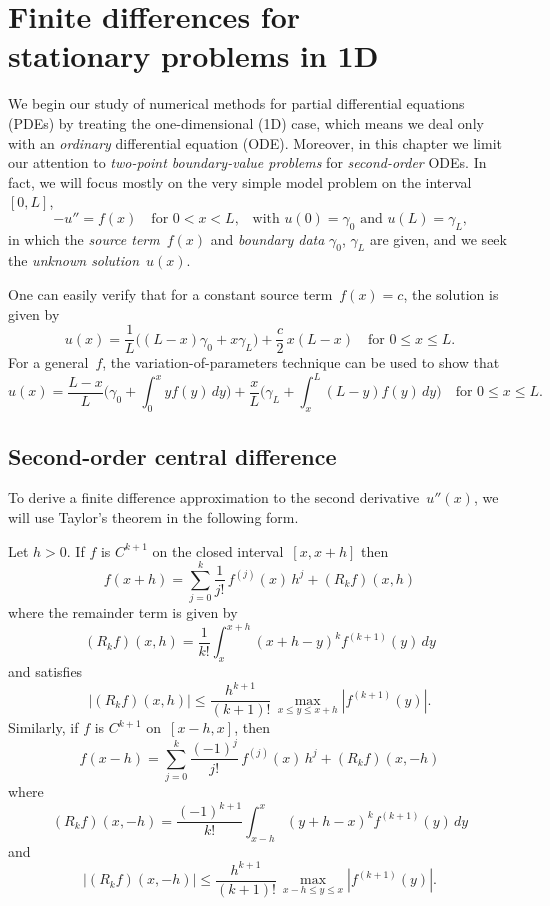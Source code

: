 \chapter[Finite differences in 1D]{Finite differences for \\ 
stationary problems in 1D}
\label{chap: finite diff 1d}
We begin our study of numerical methods for partial differential equations 
(PDEs) by treating the one-dimensional (1D) case, which means we deal only with 
an \emph{ordinary} differential equation (ODE).  Moreover, in this chapter we 
limit our attention to \emph{two-point boundary-value problems} for 
\emph{second-order} ODEs.  In fact, we will focus mostly on the very simple 
model problem on the interval~$[0,L]$,
\begin{equation}\label{eq: model 1d}
-u''=f(x)\quad\text{for $0<x<L$,}
	\quad\text{with $u(0)=\gamma_0$ and $u(L)=\gamma_L$,}
\end{equation}
in which the \emph{source term}~$f(x)$ and \emph{boundary data} $\gamma_0$, 
$\gamma_L$ are given, and we seek the \emph{unknown solution}~$u(x)$.

One can easily verify that for a constant source term~$f(x)=c$, the solution is 
given by
\[
u(x)=\frac{1}{L}\bigl((L-x)\gamma_0+x\gamma_L\bigr)+\frac{c}{2}\,x(L-x)
	\quad\text{for $0\le x\le L$.}
\]
For a general~$f$, the variation-of-parameters technique can be used to show 
that
\begin{equation}\label{eq: model 1d exact soln}
u(x)=\frac{L-x}{L}\biggl(\gamma_0+\int_0^x yf(y)\,dy\biggr)
	+\frac{x}{L}\biggl(\gamma_L+\int_x^L(L-y)f(y)\,dy\biggr)
	\quad\text{for $0\le x\le L$.}
\end{equation}

\begin{theorem}

\end{theorem}


\section{Second-order central difference}
To derive a finite difference approximation to the second derivative~$u''(x)$, 
we will use Taylor's theorem in the following form.

\begin{theorem}
Let $h>0$. If $f$ is $C^{k+1}$ on the closed interval~$[x,x+h]$ then
\[
f(x+h)=\sum_{j=0}^k\frac{1}{j!}\,f^{(j)}(x)\,h^j+(R_kf)(x,h)
\]
where the remainder term is given by
\[
(R_kf)(x,h)=\frac{1}{k!}\int_x^{x+h}(x+h-y)^kf^{(k+1)}(y)\,dy
\]
and satisfies
\[
|(R_kf)(x,h)|\le\frac{h^{k+1}}{(k+1)!}\,\max_{x\le y\le x+h}|f^{(k+1)}(y)|.
\]
Similarly, if $f$ is $C^{k+1}$ on~$[x-h,x]$, then
\[
f(x-h)=\sum_{j=0}^k\frac{(-1)^j}{j!}\,f^{(j)}(x)\,h^j+(R_kf)(x,-h)
\]
where 
\[
(R_kf)(x,-h)=\frac{(-1)^{k+1}}{k!}\int_{x-h}^x(y+h-x)^kf^{(k+1)}(y)\,dy
\]
and
\[
|(R_kf)(x,-h)|\le\frac{h^{k+1}}{(k+1)!}\,\max_{x-h\le y\le x}|f^{(k+1)}(y)|.
\]
\end{theorem}

